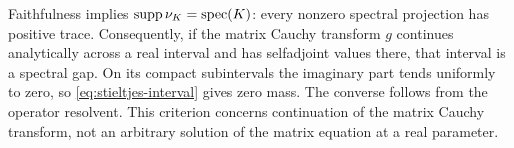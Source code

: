 Faithfulness implies $\operatorname{supp}\nu_K=\operatorname{spec}(K)$: every nonzero spectral projection has positive trace.
Consequently, if the matrix Cauchy transform $g$ continues analytically across a real interval and has selfadjoint values there, that interval is a spectral gap.
On its compact subintervals the imaginary part tends uniformly to zero, so \eqref{eq:stieltjes-interval} gives zero mass.
The converse follows from the operator resolvent.
This criterion concerns continuation of the matrix Cauchy transform, not an arbitrary solution of the matrix equation at a real parameter.
